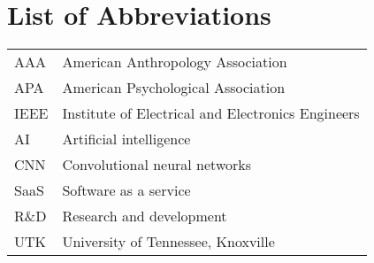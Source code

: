 \chapter*{List of Abbreviations} \label{abbreviations}

\begin{tabular}{@{}C{1in} L{4.5in}}
AAA & American Anthropology Association \\
APA & American Psychological Association \\
IEEE & Institute of Electrical and Electronics Engineers \\
AI & Artificial intelligence \\
CNN & Convolutional neural networks \\
SaaS & Software as a service \\
R\&D & Research and development \\
UTK & University of Tennessee, Knoxville \\
\end{tabular}

